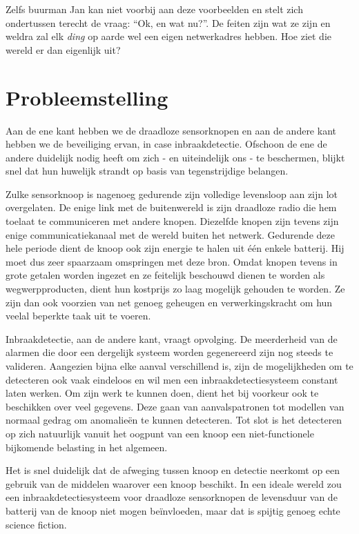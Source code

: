 \documentclass[12pt,a4paper,draft]{article}
\begin{document}
Zelfs buurman Jan kan niet voorbij aan deze voorbeelden en stelt zich
ondertussen terecht de vraag: ``Ok, en wat nu?''. De feiten zijn wat ze zijn en
weldra zal elk \emph{ding} op aarde wel een eigen netwerkadres hebben. Hoe ziet
die wereld er dan eigenlijk uit?

\section*{Probleemstelling}

Aan de ene kant hebben we de draadloze sensorknopen en aan de andere kant
hebben we de beveiliging ervan, in case inbraakdetectie. Ofschoon de ene de
andere duidelijk nodig heeft om zich - en uiteindelijk ons - te beschermen,
blijkt snel dat hun huwelijk strandt op basis van tegenstrijdige belangen.

Zulke sensorknoop is nagenoeg gedurende zijn volledige levensloop aan zijn lot
overgelaten. De enige link met de buitenwereld is zijn draadloze radio die hem
toelaat te communiceren met andere knopen. Diezelfde knopen zijn tevens zijn
enige communicatiekanaal met de wereld buiten het netwerk. Gedurende deze hele
periode dient de knoop ook zijn energie te halen uit \'e\'en enkele batterij.
Hij moet dus zeer spaarzaam omspringen met deze bron. Omdat knopen tevens in
grote getalen worden ingezet en ze feitelijk beschouwd dienen te worden als
wegwerpproducten, dient hun kostprijs zo laag mogelijk gehouden te worden. Ze
zijn dan ook voorzien van net genoeg geheugen en verwerkingskracht om hun
veelal beperkte taak uit te voeren.

Inbraakdetectie, aan de andere kant, vraagt opvolging. De meerderheid van de
alarmen die door een dergelijk systeem worden gegenereerd zijn nog steeds te
valideren. Aangezien bijna elke aanval verschillend is, zijn de mogelijkheden
om te detecteren ook vaak eindeloos en wil men een inbraakdetectiesysteem
constant laten werken. Om zijn werk te kunnen doen, dient het bij voorkeur ook
te beschikken over veel gegevens. Deze gaan van aanvalspatronen tot modellen
van normaal gedrag om anomalie\"en te kunnen detecteren. Tot slot is het
detecteren op zich natuurlijk vanuit het oogpunt van een knoop een
niet-functionele bijkomende belasting in het algemeen.

Het is snel duidelijk dat de afweging tussen knoop en detectie neerkomt op een
gebruik van de middelen waarover een knoop beschikt. In een ideale wereld zou
een inbraakdetectiesysteem voor draadloze sensorknopen de levensduur van de
batterij van de knoop niet mogen be\"invloeden, maar dat is spijtig genoeg
echte science fiction.
\end{document}
